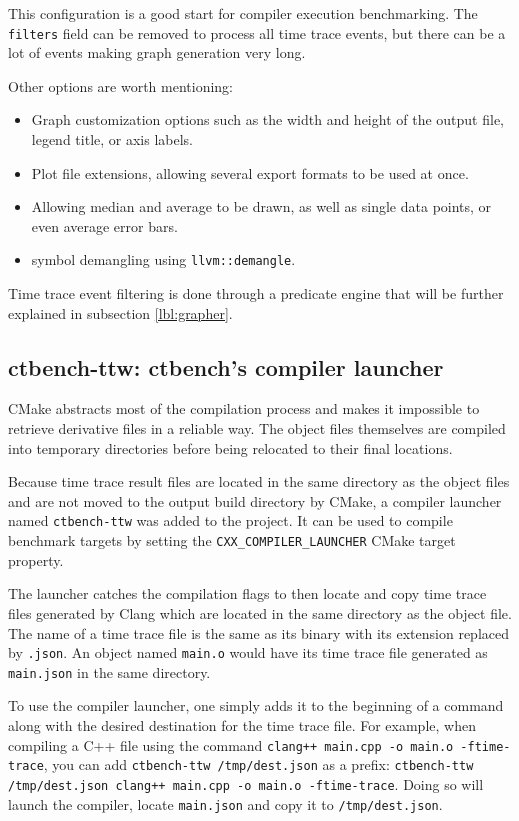 \documentclass[../../main.tex]{subfiles}
\begin{document}
This configuration is a good start for compiler execution benchmarking. The
\lstinline{filters} field can be removed to process all time trace events,
but there can be a lot of events making graph generation very long.

Other options are worth mentioning:

\begin{itemize}
\item Graph customization options such as the width and height of the output
      file, legend title, or axis labels.
\item Plot file extensions, allowing several export formats to be used at once.
\item Allowing median and average to be drawn, as well as single data points,
      or even average error bars.
\item \cpp symbol demangling using \lstinline{llvm::demangle}.
\end{itemize}

Time trace event filtering is done through a predicate engine that will be
further explained in subsection \ref{lbl:grapher}.

\subsection{ctbench-ttw: ctbench's compiler launcher}

CMake abstracts most of the compilation process and makes it impossible to
retrieve derivative files in a reliable way. The object files themselves are
compiled into temporary directories before being relocated to their final
locations.

Because time trace result files are located in the same directory as the object
files and are not moved to the output build directory by CMake, a compiler
launcher named \lstinline{ctbench-ttw} was added to the project.
It can be used to compile benchmark targets by setting the
\lstinline{CXX_COMPILER_LAUNCHER} CMake target property.

The launcher catches the compilation flags to then locate and copy time trace
files generated by Clang which are located in the same directory as the object
file. The name of a time trace file is the same as its binary with its extension
replaced by \lstinline{.json}. An object named \lstinline{main.o} would have its
time trace file generated as \lstinline{main.json} in the same directory.

To use the compiler launcher, one simply adds it to the beginning of a command
along with the desired destination for the time trace file.
For example, when compiling a C++ file using the command
\lstinline{clang++ main.cpp -o main.o -ftime-trace}, you can add
\lstinline{ctbench-ttw /tmp/dest.json} as a prefix:
\lstinline{ctbench-ttw /tmp/dest.json clang++ main.cpp -o main.o -ftime-trace}.
Doing so will launch the compiler, locate \lstinline{main.json} and copy it to
\lstinline{/tmp/dest.json}.
\end{document}
